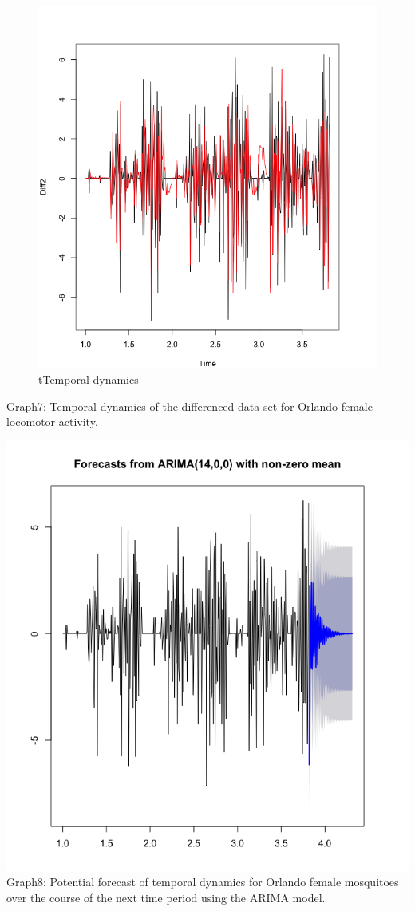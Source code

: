 \documentclass[]{article}
\begin{document}
\begin{figure}
\centering
\includegraphics{TempDynFP.png}
\caption{tTemporal dynamics}
\end{figure}

Graph7: Temporal dynamics of the differenced data set for Orlando female
locomotor activity.

\includegraphics{Forecast.png} Graph8: Potential forecast of temporal
dynamics for Orlando female mosquitoes over the course of the next time
period using the ARIMA model.
\end{document}
